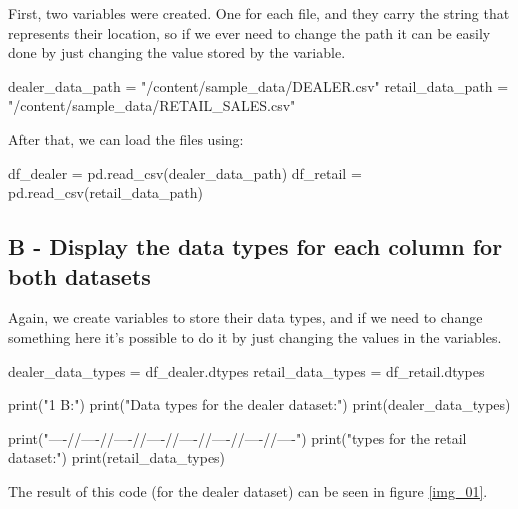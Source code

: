 \documentclass[a4paper, 12pt]{article}
\begin{document}
First, two variables were created. One for each file, and they carry the string that represents their location, so if we ever need to change the path it can be easily done by just changing the value stored by the variable.

\begin{python}
	dealer_data_path = "/content/sample_data/DEALER.csv"
	retail_data_path = "/content/sample_data/RETAIL_SALES.csv"
\end{python}

After that, we can load the files using:

\begin{python}
	df_dealer = pd.read_csv(dealer_data_path)
	df_retail = pd.read_csv(retail_data_path)
\end{python}

\subsection{B - Display the data types for each column for both datasets}

Again, we create variables to store their data types, and if we need to change something here it's possible to do it by just changing the values in the variables.

\begin{python}
	dealer_data_types = df_dealer.dtypes
	retail_data_types = df_retail.dtypes
\end{python}

\begin{python}
	print("1 B:\n")
	print("Data types for the dealer dataset:\n")
	print(dealer_data_types)
	
	print("\n----//----//----//----//----//----//----//----")
	print("\nData types for the retail dataset:\n")
	print(retail_data_types)
\end{python}

The result of this code (for the dealer dataset) can be seen in figure \ref{img_01}.
\end{document}
